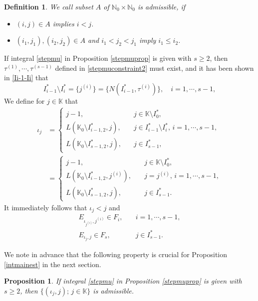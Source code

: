 \documentclass[11pt,reqno]{amsart}
\newtheorem{proposition}[theorem]{Proposition}
\newtheorem{definition}[theorem]{Definition}
\numberwithin{equation}{section}
\theoremstyle{definition}
\begin{document}
\begin{definition}\label{defadmissible}
	We call subset $A$ of $\mathbb{N}_0\times\mathbb{N}_0$ is admissible, if
	\begin{itemize}
		\item [1)] $(i,j)\in A$ implies $i<j$.
		
		\item [2)] $(i_1,j_1),(i_2,j_2)\in A$ and $i_1<j_2<j_1$ imply $i_1\leq i_2$.
	\end{itemize}
\end{definition}


If integral \eqref{stepmu} in Proposition \ref{stepmuprop} is given with $s\geq2$, then $\tau^{(1)},\cdots,\tau^{(s-1)}$ defined in \eqref{stepmuconstraint2} must exist, and it has been shown in \eqref{Ii-1-Ii} that
\begin{equation*}
	I_{i-1}^*\setminus I_i^*=\{j^{(i)}\}=\{N(I_{i-1}^*,\tau^{(i)})\},\quad i=1,\cdots,s-1,
\end{equation*}
We define for $j\in\mathbb{K}$ that
\begin{equation}\label{defh_j}
	\begin{split}
		\iota_j&=\begin{cases}
			j-1,&j\in\mathbb{K}\setminus I_0^*,\\
			L(\mathbb{K}_0\setminus I_{i-1,2}^*,j),\quad&j\in I_{i-1}^*\setminus I_i^*,\,i=1,\cdots,s-1,\\
			L(\mathbb{K}_0\setminus I_{s-1,2}^*,j),&j\in I_{s-1}^*,
		\end{cases}\\
		&=\begin{cases}
			j-1,&j\in\mathbb{K}\setminus I_0^*,\\
			L(\mathbb{K}_0\setminus I_{i-1,2}^*,j^{(i)}),\quad&j=j^{(i)},\,i=1,\cdots,s-1,\\
			L(\mathbb{K}_0\setminus I_{s-1,2}^*,j),&j\in I_{s-1}^*.
		\end{cases}
	\end{split}
\end{equation}
It immediately follows that $\iota_j<j$ and
\begin{equation}\label{EFiota}
	\begin{split}
		E_{\iota_{j^{(i)}},j^{(i)}}\in F_i,\quad&i=1,\cdots,s-1,\\
		E_{\iota_j,j}\in F_s,\quad&j\in I_{s-1}^*.
	\end{split}
\end{equation}

We note in advance that the following property is crucial for Proposition \ref{intmainest} in the next section.
\begin{proposition}\label{lmadmissible}
	If integral \eqref{stepmu} in Proposition \ref{stepmuprop} is given with $s\geq2$, then $\{(\iota_j,j);\,j\in\mathbb{K}\}$ is admissible.	
\end{proposition}
\end{document}
